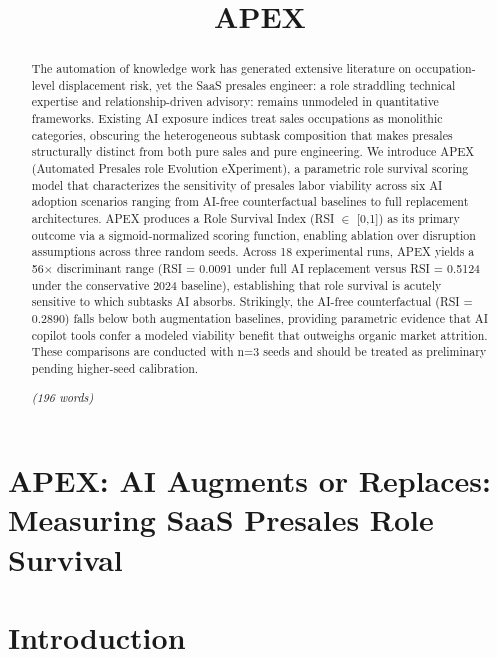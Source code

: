 \documentclass[10pt, conference]{IEEEtran}
\title{APEX}
\author{\IEEEauthorblockN{Akash Anipakalu Giridhar}}
\begin{document}
\begin{abstract}
The automation of knowledge work has generated extensive literature on occupation-level displacement risk, yet the SaaS presales engineer: a role straddling technical expertise and relationship-driven advisory: remains unmodeled in quantitative frameworks. Existing AI exposure indices \cite{chang2024survey} treat sales occupations as monolithic categories, obscuring the heterogeneous subtask composition that makes presales structurally distinct from both pure sales and pure engineering. We introduce APEX (Automated Presales role Evolution eXperiment), a parametric role survival scoring model that characterizes the sensitivity of presales labor viability across six AI adoption scenarios ranging from AI-free counterfactual baselines to full replacement architectures. APEX produces a Role Survival Index (RSI $\in$ [0,1]) as its primary outcome via a sigmoid-normalized scoring function, enabling ablation over disruption assumptions across three random seeds. Across 18 experimental runs, APEX yields a 56$\times$ discriminant range (RSI = 0.0091 under full AI replacement versus RSI = 0.5124 under the conservative 2024 baseline), establishing that role survival is acutely sensitive to which subtasks AI absorbs. Strikingly, the AI-free counterfactual (RSI = 0.2890) falls below both augmentation baselines, providing parametric evidence that AI copilot tools confer a modeled viability benefit that outweighs organic market attrition. These comparisons are conducted with n=3 seeds and should be treated as preliminary pending higher-seed calibration.

\textit{(196 words)}
\end{abstract}

\maketitle
\begin{abstract}

\end{abstract}

\section{APEX: AI Augments or Replaces: Measuring SaaS Presales Role Survival}

\label{sec:apex_ai_augments_or_replaces_measuring_s}

\section{Introduction}
\end{document}
